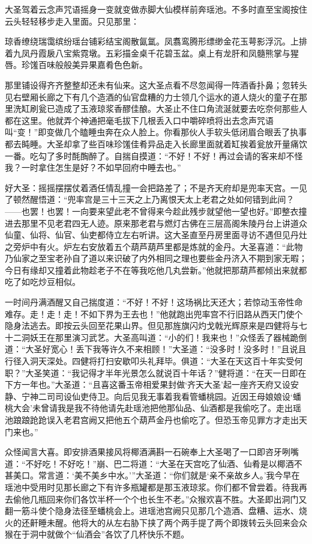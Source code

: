 \documentclass[12pt,UTF8]{ctexbook}
\begin{document}
{大圣驾着云念声咒语摇身一变就变做赤脚大仙模样前奔瑶池。不多时直至宝阁按住云头轻轻移步走入里面。只见那里：

琼香缭绕瑞霭缤纷瑶台铺彩结宝阁散氤氲。凤翥鸾腾形缥缈金花玉萼影浮沉。上排着九凤丹霞扆八宝紫霓墩。五彩描金桌千花碧玉盆。桌上有龙肝和凤髓熊掌与猩唇。珍馐百味般般美异果嘉肴色色新。

那里铺设得齐齐整整却还未有仙来。这大圣点看不尽忽闻得一阵酒香扑鼻；忽转头见右壁厢长廊之下有几个造酒的仙官盘糟的力士领几个运水的道人烧火的童子在那里洗缸刷瓮已造成了玉液琼浆香醪佳酿。大圣止不住口角流涎就要去吃奈何那些人都在这里。他就弄个神通把毫毛拔下几根丢入口中嚼碎喷将出去念声咒语叫“变！”即变做几个瞌睡虫奔在众人脸上。你看那伙人手软头低闭眉合眼丢了执事都去盹睡。大圣却拿了些百味珍馐佳肴异品走入长廊里面就着缸挨着瓮放开量痛饮一番。吃勾了多时酕醄醉了。自揣自摸道：“不好！不好！再过会请的客来却不怪我？一时拿住怎生是好？不如早回府中睡去也。”

好大圣：摇摇摆摆仗着酒任情乱撞一会把路差了；不是齐天府却是兜率天宫。一见了顿然醒悟道：“兜率宫是三十三天之上乃离恨天太上老君之处如何错到此间？——也罢！也罢！一向要来望此老不曾得来今趁此残步就望他一望也好。”即整衣撞进去那里不见老君四无人迹。原来那老君与燃灯古佛在三层高阁朱陵丹台上讲道众仙童、仙将、仙官、仙吏都侍立左右听讲。这大圣直至丹房里面寻访不遇但见丹灶之旁炉中有火。炉左右安放着五个葫芦葫芦里都是炼就的金丹。大圣喜道：“此物乃仙家之至宝老孙自了道以来识破了内外相同之理也要些金丹济入不期到家无暇；今日有缘却又撞着此物趁老子不在等我吃他几丸尝新。”他就把那葫芦都倾出来就都吃了如吃炒豆相似。

一时间丹满酒醒又自己揣度道：“不好！不好！这场祸比天还大；若惊动玉帝性命难存。走！走！走！不如下界为王去也！”他就跑出兜率宫不行旧路从西天门使个隐身法逃去。即按云头回至花果山界。但见那旌旗闪灼戈戟光辉原来是四健将与七十二洞妖王在那里演习武艺。大圣高叫道：“小的们！我来也！”众怪丢了器械跪倒道：“大圣好宽心！丢下我等许久不来相顾！”大圣道：“没多时！没多时！”且说且行径入洞天深处。四健将打扫安歇叩头礼拜毕。俱道：“大圣在天这百十年实受何职？”大圣笑道：“我记得才半年光景怎么就说百十年话？”健将道：“在天一日即在下方一年也。”大圣道：“且喜这番玉帝相爱果封做‘齐天大圣’起一座齐天府又设安静、宁神二司司设仙吏侍卫。向后见我无事着我看管蟠桃园。近因王母娘娘设‘蟠桃大会’未曾请我是我不待他请先赴瑶池把他那仙品、仙酒都是我偷吃了。走出瑶池踉踉跄跄误入老君宫阙又把他五个葫芦金丹也偷吃了。但恐玉帝见罪方才走出天门来也。”

众怪闻言大喜。即安排酒果接风将椰酒满斟一石碗奉上大圣喝了一口即咨牙咧嘴道：“不好吃！不好吃！”崩、巴二将道：“大圣在天宫吃了仙酒、仙肴是以椰酒不甚美口。常言道：‘美不美乡中水。’”大圣道：“你们就是‘亲不亲故乡人。’我今早在瑶池中受用时见那长廊之下有许多瓶罐都是那玉液琼浆。你们都不曾尝着。待我再去偷他几瓶回来你们各饮半杯一个个也长生不老。”众猴欢喜不胜。大圣即出洞门又翻一筋斗使个隐身法径至蟠桃会上。进瑶池宫阙只见那几个造酒、盘糟、运水、烧火的还鼾睡未醒。他将大的从左右胁下挟了两个两手提了两个即拨转云头回来会众猴在于洞中就做个“仙酒会”各饮了几杯快乐不题。

}
\end{document}
